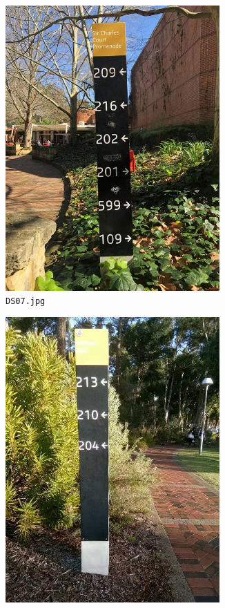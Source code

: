\documentclass{article}
\begin{document}
\begin{figure}[h]
\begin{subfigure}[h]{0.22\textwidth}
    \includegraphics[width=0.9\textwidth]{../train/task2/DS07}
    \caption[DS07]{
      \lstinline{DS07.jpg}
    }
    \label{fig:ds07}
  \end{subfigure}
  \begin{subfigure}[h]{0.22\textwidth}
    \centering
    \includegraphics[width=0.9\textwidth]{../train/task2/DS10}

\end{subfigure}
\end{figure}
\end{document}
